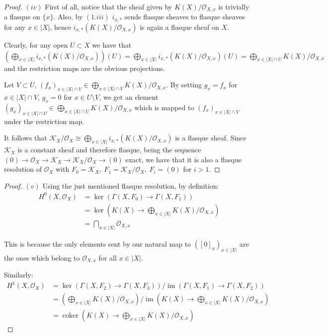 \documentclass{article}
\DeclareMathOperator{\im}{im}
\DeclareMathOperator{\coker}{coker}
\begin{document}
\begin{proof}
    $(iv)$ First of all, notice that the sheaf given by $K(X)/\mathcal{O}_{X,x}$
    is trivially a flasque on $\{x\}$. Also, by $(1.iii)$ $i_{x,*}$ sends
    flasque sheaves to flasque sheaves for any $x\in |X|$, hence
    $i_{x,*}(K(X)/\mathcal{O}_{X,x})$ is again a flasque sheaf on $X$.

    Clearly, for any open $U\subset X$ we have that $(\bigoplus_{x\in
    |X|}i_{x,*}(K(X)/\mathcal{O}_{X,x}))(U)=\bigoplus_{x\in
    |X|}i_{x,*}(K(X)/\mathcal{O}_{X,x})(U)=\bigoplus_{x\in
    |X|\cap U}K(X)/\mathcal{O}_{X,x}$ and the restriction maps are the obvious
    projections.

    Let $V\subset U$, $(f_x)_{x\in |X|\cap V}\in\bigoplus_{x\in |X|\cap V}K(X)/
    \mathcal{O}_{X,x}$. By setting $g_x=f_x$ for $x\in |X|\cap V$, $g_x=0$ for
    $x\in U\setminus V$, we get an element $(g_x)_{x\in |X|\cap U}\in
    \bigoplus_{x\in |X|\cap U}K(X)/\mathcal{O}_{X,x}$ which is mapped to
    $(f_x)_{x\in |X|\cap V}$ under the restriction map.
    
    It follows that $\mathcal{K}_X/\mathcal{O}_X\cong
    \bigoplus_{x\in |X|}i_{x,*}(K(X)/\mathcal{O}_{X,x})$ is a flasque sheaf.
    Since $\mathcal{K}_X$ is a constant
    sheaf and therefore flasque, being the sequence $(0)\rightarrow\mathcal{O}_X
    \rightarrow\mathcal{K}_X\rightarrow\mathcal{K}_X/\mathcal{O}_X\rightarrow
    (0)$ exact, we have that it is also a flasque resolution of $\mathcal{O}_X$
    with $F_0=\mathcal{K}_X,\ F_1=\mathcal{K}_X/\mathcal{O}_X,\ F_i=(0)$ for
    $i>1$.
\end{proof}

\begin{proof}
    $(v)$ Using the just mentioned flasque resolution, by definition:
    \begin{align*}
        H^0(X,\mathcal{O}_X) &=\ker(\Gamma(X,F_0)\rightarrow\Gamma(X,F_1)) \\
        &=\ker\left(K(X)\rightarrow\bigoplus_{x\in |X|}K(X)/
        \mathcal{O}_{X,x}\right) \\
        &=\bigcap_{x\in |X|}\mathcal{O}_{X,x}
    \end{align*}
    
    This is because the only elements sent by our natural map to $([0]_x)_{x\in
    |X|}$ are the ones which belong to $\mathcal{O}_{X,x}$ for all $x\in |X|$.

    Similarly:
    \begin{align*}
        H^1(X,\mathcal{O}_X)
        &=\ker(\Gamma(X,F_2)\rightarrow\Gamma(X,F_3))/\im(\Gamma(X,F_1)\rightarrow\Gamma(X,F_2)) \\
        &=\left(\bigoplus_{x\in
        |X|}K(X)/\mathcal{O}_{X,x}\right)/\im\left(K(X)\rightarrow
        \bigoplus_{x\in |X|}K(X)/\mathcal{O}_{X,x}\right) \\
        &=\coker\left(K(X)\rightarrow\bigoplus_{x\in
        |X|}K(X)/\mathcal{O}_{X,x}\right)
    \end{align*}
\end{proof}
\end{document}
